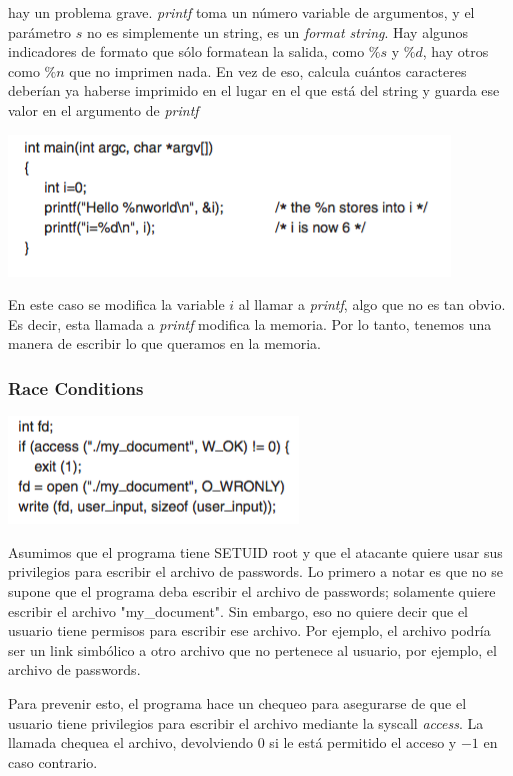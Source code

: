 hay un problema grave. \textit{printf} toma un número variable de argumentos, y el parámetro $s$ no es simplemente un string, es un \textit{format string}. Hay algunos indicadores de formato que sólo formatean la salida, como $\%s$ y $\%d$, hay otros como $\%n$ que no imprimen nada. En vez de eso, calcula cuántos caracteres deberían ya haberse imprimido en el lugar en el que está del string y guarda ese valor en el argumento de \textit{printf}

\includegraphics[scale=0.7]{imagenes/format-string3}

En este caso se modifica la variable $i$ al llamar a \textit{printf}, algo que no es tan obvio. Es decir, esta llamada a \textit{printf} modifica la memoria. Por lo tanto, tenemos una manera de escribir lo que queramos en la memoria.


\subsubsection{Race Conditions}

\includegraphics[scale=0.7]{imagenes/race-condition}

Asumimos que el programa tiene SETUID root y que el atacante quiere usar sus privilegios para escribir el archivo de passwords. Lo primero a notar es que no se supone que el programa deba escribir el archivo de passwords; solamente quiere escribir el archivo "my_document". Sin embargo, eso no quiere decir que el usuario tiene permisos para escribir ese archivo. Por ejemplo, el archivo podría ser un link simbólico a otro archivo que no pertenece al usuario, por ejemplo, el archivo de passwords.

Para prevenir esto, el programa hace un chequeo para asegurarse de que el usuario tiene privilegios para escribir el archivo mediante la syscall \textit{access}. La llamada chequea el archivo, devolviendo $0$ si le está permitido el acceso y $-1$ en caso contrario. 

